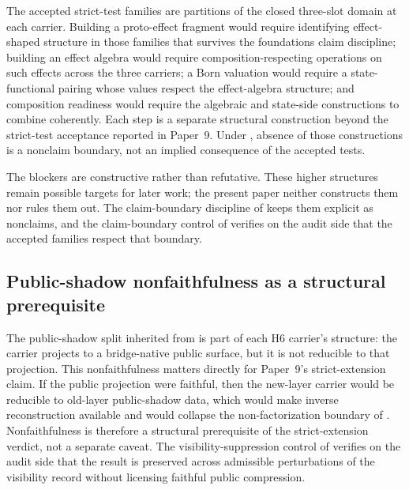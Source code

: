 \documentclass[11pt]{article}
\newcommand{\NewLayer}{H6}
\newcommand{\PaperNine}{Paper~9}
\theoremstyle{definition}
\begin{document}
The accepted strict-test families are partitions of the closed three-slot
domain at each carrier.  Building a proto-effect fragment would require
identifying effect-shaped structure in those families that survives the
foundations claim discipline; building an effect algebra would require
composition-respecting operations on such effects across the three carriers; a
Born valuation would require a state-functional pairing whose values respect
the effect-algebra structure; and composition readiness would require the
algebraic and state-side constructions to combine coherently.  Each step is a
separate structural construction beyond the strict-test acceptance reported in
\PaperNine{}.  Under \cite{Tsiokos2026FoundationsII}, absence of those
constructions is a nonclaim boundary, not an implied consequence of the
accepted tests.

The blockers are constructive rather than refutative.  These higher structures
remain possible targets for later work; the present paper neither constructs
them nor rules them out.  The claim-boundary discipline of
 keeps them explicit as nonclaims, and
the claim-boundary control of 
verifies on the audit side that the accepted families respect that boundary.

\subsection{Public-shadow nonfaithfulness as a structural prerequisite}\label{subsec:public-shadow-nonfaithfulness}

The public-shadow split inherited from
\cite{Tsiokos2026CarrierExactification} is part of each \NewLayer{} carrier's
structure: the carrier projects to a bridge-native public surface, but it is
not reducible to that projection.  This nonfaithfulness matters directly for
\PaperNine{}'s strict-extension claim.  If the public projection were faithful,
then the new-layer carrier would be reducible to old-layer public-shadow data,
which would make inverse reconstruction available and would collapse the
non-factorization boundary of
.
Nonfaithfulness is therefore a structural prerequisite of the strict-extension
verdict, not a separate caveat.  The visibility-suppression control of
 verifies on the audit side that
the result is preserved across admissible perturbations of the visibility
record without licensing faithful public compression.
\end{document}
